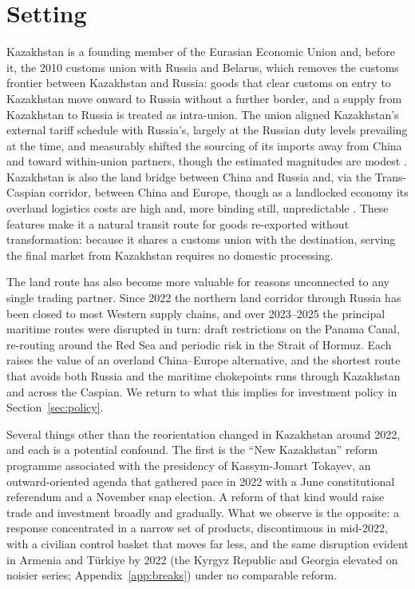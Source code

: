\documentclass[12pt]{article}
\begin{document}
\section{Setting}\label{sec:setting}

Kazakhstan is a founding member of the Eurasian Economic Union and, before it, the 2010
customs union with Russia and Belarus, which removes the customs
frontier between Kazakhstan and Russia: goods that clear customs on entry to Kazakhstan move
onward to Russia without a further border, and a supply from Kazakhstan to Russia is treated
as intra-union. The union aligned Kazakhstan's external tariff schedule with Russia's, largely
at the Russian duty levels prevailing at the time, and measurably shifted the sourcing of its
imports away from China and toward within-union partners, though the estimated magnitudes are modest
\citep{isakova2016tariffs}. Kazakhstan is also the land bridge between China and Russia and,
via the Trans-Caspian corridor, between China and Europe, though as a landlocked economy its
overland logistics costs are high and, more binding still, unpredictable
\citep{arvis2010landlocked}. These features make it a natural transit route for goods
re-exported without transformation: because it shares a customs union with the destination,
serving the final market from Kazakhstan requires no domestic processing.

The land route has also become more valuable for reasons unconnected to any single trading
partner. Since 2022 the northern land corridor through Russia has been closed to most Western
supply chains, and over 2023--2025 the principal maritime routes were disrupted in turn: draft
restrictions on the Panama Canal, re-routing around the Red Sea and periodic risk in the
Strait of Hormuz. Each raises the value of an overland China--Europe alternative, and the
shortest route that avoids both Russia and the maritime chokepoints runs through Kazakhstan
and across the Caspian. We return to what this implies for investment policy in
Section~\ref{sec:policy}.

Several things other than the reorientation changed in Kazakhstan around 2022, and each is a
potential confound. The first is the ``New Kazakhstan'' reform programme associated with the
presidency of Kassym-Jomart Tokayev, an outward-oriented agenda that gathered pace in 2022
with a June constitutional referendum and a November snap election. A reform of that kind would
raise trade and investment broadly and gradually. What we observe is the opposite: a response
concentrated in a narrow set of products, discontinuous in mid-2022, with a civilian control
basket that moves far less, and the same disruption evident in Armenia and T\"urkiye by 2022
(the Kyrgyz Republic and Georgia elevated on noisier series; Appendix~\ref{app:breaks}) under no
comparable reform.
\end{document}
